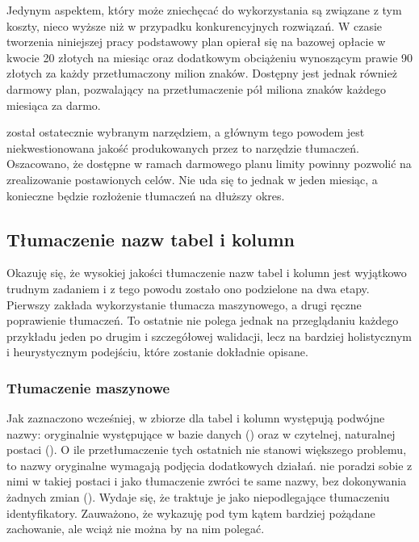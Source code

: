 Jedynym aspektem, który może zniechęcać do wykorzystania  są związane z tym koszty, nieco wyższe niż w przypadku konkurencyjnych rozwiązań. W czasie tworzenia niniejszej pracy podstawowy plan opierał się na bazowej opłacie w kwocie 20 złotych na miesiąc oraz dodatkowym obciążeniu wynoszącym prawie 90 złotych za każdy przetłumaczony milion znaków. Dostępny jest jednak również darmowy plan, pozwalający na przetłumaczenie pół miliona znaków każdego miesiąca za darmo.

 został ostatecznie wybranym narzędziem, a głównym tego powodem jest niekwestionowana jakość produkowanych przez to narzędzie tłumaczeń. Oszacowano, że dostępne w ramach darmowego planu limity powinny pozwolić na zrealizowanie postawionych celów. Nie uda się to jednak w jeden miesiąc, a konieczne będzie rozłożenie tłumaczeń na dłuższy okres.

\subsection{Tłumaczenie nazw tabel i kolumn}
\label{text:schema-translation}
Okazuję się, że wysokiej jakości tłumaczenie nazw tabel i kolumn jest wyjątkowo trudnym zadaniem i z tego powodu zostało ono podzielone na dwa etapy. Pierwszy zakłada wykorzystanie tłumacza maszynowego, a drugi ręczne poprawienie tłumaczeń. To ostatnie nie polega jednak na przeglądaniu każdego przykładu jeden po drugim i szczegółowej walidacji, lecz na bardziej holistycznym i heurystycznym podejściu, które zostanie dokładnie opisane.


\subsubsection{Tłumaczenie maszynowe}
Jak zaznaczono wcześniej, w zbiorze  dla tabel i kolumn występują podwójne nazwy: oryginalnie występujące w bazie danych () oraz w czytelnej, naturalnej postaci (). O ile przetłumaczenie tych ostatnich nie stanowi większego problemu, to nazwy oryginalne wymagają podjęcia dodatkowych działań.  nie poradzi sobie z nimi w takiej postaci i jako tłumaczenie zwróci te same nazwy, bez dokonywania żadnych zmian (\mbox{}). Wydaje się, że traktuje je jako niepodlegające tłumaczeniu identyfikatory. Zauważono, że  wykazuję pod tym kątem bardziej pożądane zachowanie, ale wciąż nie można by na nim polegać. 

